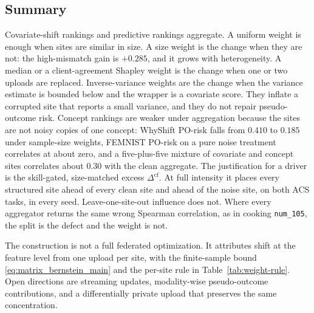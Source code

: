\subsection{Summary}
\label{sec:fed-summary}

Covariate-shift rankings and predictive rankings aggregate.
A uniform weight is enough when sites are similar in size.
A size weight is the change when they are not: the high-mismatch gain is
\(+0.285\), and it grows with heterogeneity.
A median or a client-agreement Shapley weight is the change when one or
two uploads are replaced.
Inverse-variance weights are the change when the variance estimate is
bounded below and the wrapper is a covariate score.
They inflate a corrupted site that reports a small variance, and they do
not repair pseudo-outcome risk.
Concept rankings are weaker under aggregation because the sites are not
noisy copies of one concept: WhyShift PO-risk falls from \(0.410\) to
\(0.185\) under sample-size weights, FEMNIST PO-risk on a pure noise
treatment correlates at about zero, and a five-plus-five mixture of
covariate and concept sites correlates about \(0.30\) with the clean
aggregate.
The justification for a driver is the skill-gated, size-matched excess
\(\Delta^{\mathrm{cf}}\).
At full intensity it places every structured site ahead of every clean
site and ahead of the noise site, on both ACS tasks, in every seed.
Leave-one-site-out influence does not.
Where every aggregator returns the same wrong Spearman correlation, as in
cooking \texttt{num\_105}, the split is the defect and the weight is not.

The construction is not a full federated optimization.
It attributes shift at the feature level from one upload per site, with
the finite-sample bound \eqref{eq:matrix_bernstein_main} and the per-site
rule in Table~\ref{tab:weight-rule}.
Open directions are streaming updates, modality-wise pseudo-outcome
contributions, and a differentially private upload that preserves the same
concentration.
